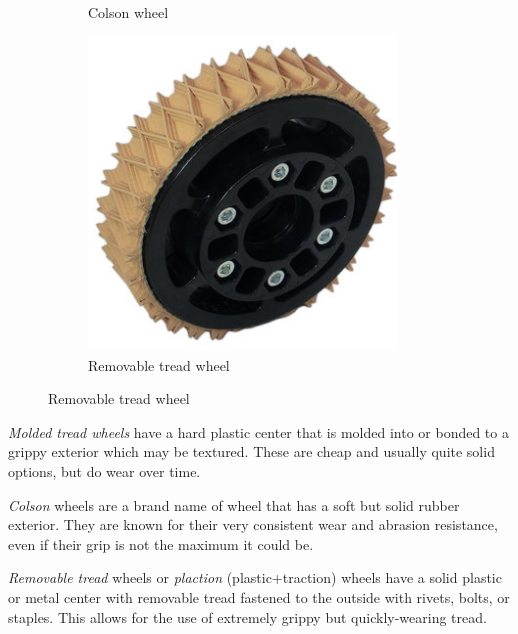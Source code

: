 \documentclass[10pt,letterpaper]{book}
\begin{document}
\begin{figure}[H]
\begin{subfigure}[b]{.24\linewidth}
			\caption{Colson wheel}
		\end{subfigure}\begin{subfigure}[b]{.24\linewidth}
			\includegraphics[width=0.9\textwidth]{imgs/wheel_plaction.png}
			\caption{Removable tread wheel}
		\end{subfigure}
	\end{figure}
		
	\begin{asparaenum}[a)]
		\item \textit{Molded tread wheels} have a hard plastic center that is molded into or bonded to a grippy exterior which may be textured. These are cheap and usually quite solid options, but do wear over time.
		\item \textit{Colson} wheels are a brand name of wheel that has a soft but solid rubber exterior. They are known for their very consistent wear and abrasion resistance, even if their grip is not the maximum it could be.
		\item \textit{Removable tread} wheels or \textit{plaction} (plastic+traction) wheels have a solid plastic or metal center with removable tread fastened to the outside with rivets, bolts, or staples. This allows for the use of extremely grippy but quickly-wearing tread.
	\end{asparaenum}
	
\end{document}
